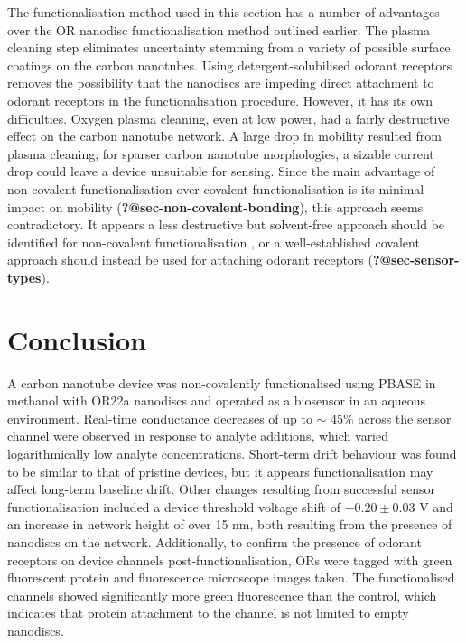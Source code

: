 \documentclass[
  a4paper,
]{scrbook}
\begin{document}
The functionalisation method used in this section has a number of
advantages over the OR nanodisc functionalisation method outlined
earlier. The plasma cleaning step eliminates uncertainty stemming from a
variety of possible surface coatings on the carbon nanotubes. Using
detergent-solubilised odorant receptors removes the possibility that the
nanodiscs are impeding direct attachment to odorant receptors in the
functionalisation procedure. However, it has its own difficulties.
Oxygen plasma cleaning, even at low power, had a fairly destructive
effect on the carbon nanotube network. A large drop in mobility resulted
from plasma cleaning; for sparser carbon nanotube morphologies, a
sizable current drop could leave a device unsuitable for sensing. Since
the main advantage of non-covalent functionalisation over covalent
functionalisation is its minimal impact on mobility
(\textbf{?@sec-non-covalent-bonding}), this approach seems
contradictory. It appears a less destructive but solvent-free approach
should be identified for non-covalent functionalisation
\autocite{Ashraf2014}, or a well-established covalent approach should
instead be used for attaching odorant receptors
(\textbf{?@sec-sensor-types}).

\hypertarget{conclusion}{%
\section{Conclusion}\label{conclusion}}

A carbon nanotube device was non-covalently functionalised using PBASE
in methanol with OR22a nanodiscs and operated as a biosensor in an
aqueous environment. Real-time conductance decreases of up to \(\sim\)
45\% across the sensor channel were observed in response to analyte
additions, which varied logarithmically low analyte concentrations.
Short-term drift behaviour was found to be similar to that of pristine
devices, but it appears functionalisation may affect long-term baseline
drift. Other changes resulting from successful sensor functionalisation
included a device threshold voltage shift of \(-0.20\pm0.03\) V and an
increase in network height of over 15 nm, both resulting from the
presence of nanodiscs on the network. Additionally, to confirm the
presence of odorant receptors on device channels post-functionalisation,
ORs were tagged with green fluorescent protein and fluorescence
microscope images taken. The functionalised channels showed
significantly more green fluorescence than the control, which indicates
that protein attachment to the channel is not limited to empty
nanodiscs.
\end{document}
